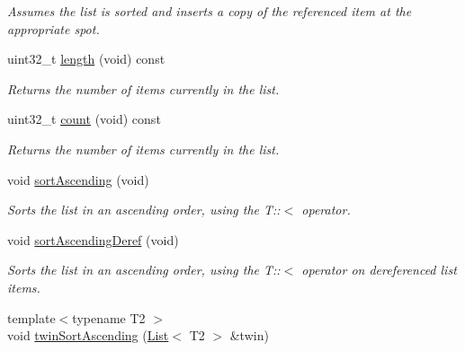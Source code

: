 \begin{DoxyCompactItemize}
\begin{DoxyCompactList}\small\item\em \-Assumes the list is sorted and inserts a copy of the referenced item at the appropriate spot. \end{DoxyCompactList}\item 
\hypertarget{classxsens_1_1List_a4ebd5bba1037b7b45c4efc9cc2f02e2e}{uint32\-\_\-t \hyperlink{classxsens_1_1List_a4ebd5bba1037b7b45c4efc9cc2f02e2e}{length} (void) const }\label{classxsens_1_1List_a4ebd5bba1037b7b45c4efc9cc2f02e2e}

\begin{DoxyCompactList}\small\item\em \-Returns the number of items currently in the list. \end{DoxyCompactList}\item 
\hypertarget{classxsens_1_1List_a430ba09ad069373d9e92b0b92b10546b}{uint32\-\_\-t \hyperlink{classxsens_1_1List_a430ba09ad069373d9e92b0b92b10546b}{count} (void) const }\label{classxsens_1_1List_a430ba09ad069373d9e92b0b92b10546b}

\begin{DoxyCompactList}\small\item\em \-Returns the number of items currently in the list. \end{DoxyCompactList}\item 
\hypertarget{classxsens_1_1List_af668e4bfa511ded8eacff8ca6e19a90e}{void \hyperlink{classxsens_1_1List_af668e4bfa511ded8eacff8ca6e19a90e}{sort\-Ascending} (void)}\label{classxsens_1_1List_af668e4bfa511ded8eacff8ca6e19a90e}

\begin{DoxyCompactList}\small\item\em \-Sorts the list in an ascending order, using the \-T\-:\-:$<$ operator. \end{DoxyCompactList}\item 
void \hyperlink{classxsens_1_1List_a2f7659a33159347cb008a269bb2b7799}{sort\-Ascending\-Deref} (void)
\begin{DoxyCompactList}\small\item\em \-Sorts the list in an ascending order, using the \-T\-:\-:$<$ operator on dereferenced list items. \end{DoxyCompactList}\item 
\hypertarget{classxsens_1_1List_ae0e5cd48978e0d321be40d10e23bc176}{{\footnotesize template$<$typename T2 $>$ }\\void \hyperlink{classxsens_1_1List_ae0e5cd48978e0d321be40d10e23bc176}{twin\-Sort\-Ascending} (\hyperlink{classxsens_1_1List}{\-List}$<$ \-T2 $>$ \&twin)}\label{classxsens_1_1List_ae0e5cd48978e0d321be40d10e23bc176}


\end{DoxyCompactItemize}

